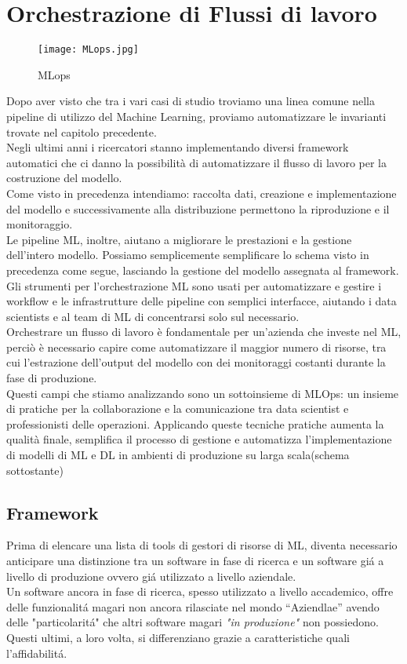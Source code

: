 \documentclass[../tesi.tex]{subfiles}
\begin{document}
\chapter{Orchestrazione di Flussi di lavoro}
\begin{figure}[htbp]
  \centering
  \texttt{[image: MLops.jpg]} 
  \caption{MLops}
  \end{figure}

Dopo aver visto che tra i vari casi di studio troviamo una linea comune nella pipeline di utilizzo del Machine Learning, proviamo automatizzare le invarianti trovate nel capitolo precedente.\\
Negli ultimi anni i ricercatori stanno implementando diversi framework automatici che ci danno la possibilità di automatizzare il flusso di lavoro per la costruzione del modello.\\
Come visto in precedenza intendiamo: raccolta dati, creazione e implementazione del modello e successivamente alla distribuzione permettono la riproduzione e il monitoraggio.\\
Le pipeline ML, inoltre, aiutano a migliorare le prestazioni e la gestione dell'intero modello.
Possiamo semplicemente semplificare lo schema visto in precedenza come segue, lasciando la gestione del modello assegnata al framework.\\
Gli strumenti per l’orchestrazione ML sono usati per automatizzare e gestire i workflow e le infrastrutture delle pipeline con semplici interfacce, aiutando i data scientists e al team di ML di concentrarsi solo sul necessario.\\
Orchestrare un flusso di lavoro è fondamentale per un’azienda che investe nel ML, perciò è necessario capire come automatizzare il maggior numero di risorse, tra cui l’estrazione dell’output del modello con dei monitoraggi costanti durante la fase di produzione.\\
Questi campi che stiamo analizzando sono un sottoinsieme di MLOps: un insieme di pratiche per la collaborazione e la comunicazione tra data scientist e professionisti delle operazioni. Applicando queste tecniche pratiche aumenta la qualità finale, semplifica il processo di gestione e automatizza l’implementazione di modelli di ML e DL in ambienti di produzione su larga scala(schema sottostante)

  \section{Framework}
  Prima di elencare una lista di tools di gestori di risorse di ML, diventa necessario anticipare una distinzione tra un software in fase di ricerca e un software giá a livello di produzione ovvero giá utilizzato a livello aziendale.\\
  Un software ancora in fase di ricerca, spesso utilizzato a livello accademico, offre delle funzionalitá magari non ancora rilasciate nel mondo ``Aziendlae'' avendo delle "particolaritá" che altri software magari \textit{"in produzione"} non possiedono.\\
  Questi ultimi, a loro volta, si differenziano grazie a caratteristiche quali l'affidabilitá.  
\end{document}

